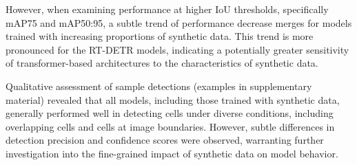 However, when examining performance at higher IoU thresholds, specifically mAP\@75 and mAP\@50:95, a subtle trend of performance decrease merges for models trained with increasing proportions of synthetic data.
This trend is more pronounced for the RT-DETR models, indicating a potentially greater sensitivity of transformer-based architectures to the characteristics of synthetic data.

Qualitative assessment of sample detections (examples in supplementary material) revealed that all models, including those trained with synthetic data, generally performed well in detecting cells under diverse conditions, including overlapping cells and cells at image boundaries.
However, subtle differences in detection precision and confidence scores were observed, warranting further investigation into the fine-grained impact of synthetic data on model behavior.

